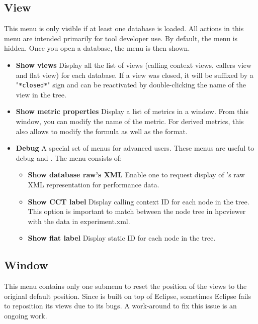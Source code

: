 
\subsection{View}
This menu is only visible if at least one database is loaded.
All actions in this menu are intended primarily for tool developer use. 
By default, the menu is hidden. Once you open a database, the menu is then shown.

\begin{itemize}
 \item \textbf{Show views}
 Display all the list of views (calling context views, callers view and flat view) for each database. If a view was closed, it will be suffixed by a "\texttt{*closed*}" sign and can be reactivated by double-clicking the name of the view in the tree.

 \item \textbf{Show metric properties}
 Display a list of metrics in a window. From this window, you can modify the name of the metric. For derived metrics, this also allows to modify the formula as well as the format.

 \item \textbf{Debug}
 A special set of menus for advanced users. These menus are useful to debug \HPCToolkit{} and \hpcviewer{}. The menu consists of:

   \begin{itemize}
     \item \textbf{Show database raw's XML}
 	Enable one to request display of \HPCToolkit{}'s raw XML representation for performance data.

     \item \textbf{Show CCT label}
 	Display calling context ID for each node in the tree. This option is important to match between the node tree in hpcviewer with the data in experiment.xml.

     \item \textbf{Show flat label}
 	Display static ID for each node in the tree.
  \end{itemize}

\end{itemize}

\subsection{Window}
This menu contains only one submenu to reset the position of the views to the original default position.
Since \hpcviewer{} is built on top of Eclipse, sometimes Eclipse fails to reposition its views due to its bugs.
A work-around to fix this issue is an ongoing work.

